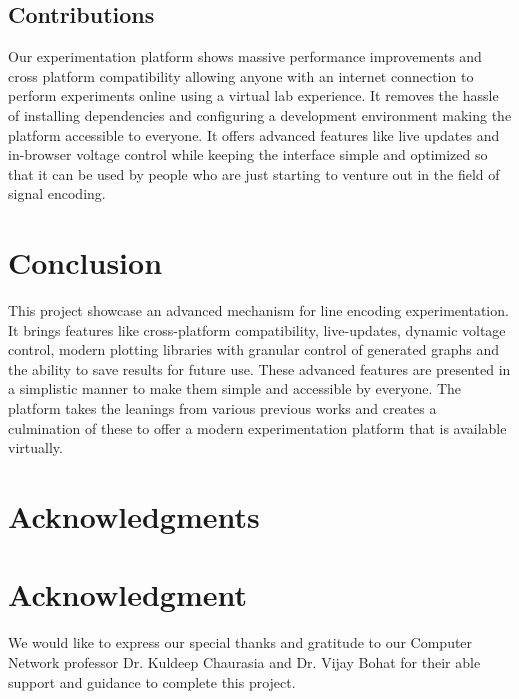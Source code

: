 \documentclass[10pt,journal,compsoc]{IEEEtran}
\begin{document}
\subsection{Contributions}

Our experimentation platform shows massive performance improvements and cross platform compatibility allowing anyone with an internet connection to perform experiments online using a virtual lab experience. It removes the hassle of installing dependencies and configuring a development environment making the platform accessible to everyone. It offers advanced features like live updates and in-browser voltage control while keeping the interface simple and optimized so that it can be used by people who are just starting to venture out in the field of signal encoding.

\section{Conclusion}
This project showcase an advanced mechanism for line encoding experimentation. It brings features like cross-platform compatibility, live-updates, dynamic voltage control, modern plotting libraries with granular control of generated graphs and the ability to save results for future use. These advanced features are presented in a simplistic manner to make them simple and accessible by everyone. The platform takes the leanings from various previous works and creates a culmination of these to offer a modern experimentation platform that is available virtually.

\ifCLASSOPTIONcompsoc
  \section*{Acknowledgments}
\else
  \section*{Acknowledgment}
\fi

We would like to express our special thanks and gratitude to our Computer Network professor Dr. Kuldeep Chaurasia and Dr. Vijay Bohat for their able support and guidance to complete this project.  

\ifCLASSOPTIONcaptionsoff
  \newpage
\fi
\end{document}
